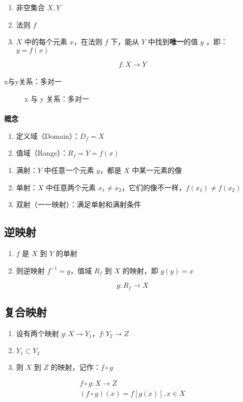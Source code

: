 \begin{enumerate}
  \item 非空集合 $X, Y$
  \item 法则 $f$
  \item $X$ 中的每个元素 $x$，在法则 $f$ 下，能从 $Y$ 中找到\textbf{唯一}的值 $y$ ，即： $y = f(x)$
\end{enumerate}

\begin{equation}
f:X \to Y
\end{equation}

\paragraph{}
x与y关系：多对一

\begin{figure}[H]
  \centering
    
    \caption{x 与 y 关系：多对一}
    \label{map}
\end{figure}

\paragraph{}
\textbf{概念}

\begin{enumerate}
  \item 定义域（Domain）：$D_f = X$
  \item 值域（Range）：$R_f = Y = f(x)$
\end{enumerate}

\begin{enumerate}
  \item 满射：$Y$ 中任意一个元素 $y$，都是 $X$ 中某一元素的像
  \item 单射：$X$ 中任意两个元素 $x_1 \neq  x_2$，它们的像不一样，$f(x_1) \neq  f(x_2)$
  \item 双射（一一映射）：满足单射和满射条件
\end{enumerate}

\subsection{逆映射}

\begin{enumerate}
  \item $f$ 是 $X$ 到 $Y$ 的单射
  \item 则逆映射 $f^{-1} = g$，值域 $R_f$ 到 $X$ 的映射，即 $g(y) = x$
\end{enumerate}

\begin{equation}
g:R_f \to X
\end{equation}

\subsection{复合映射}

\begin{enumerate}
  \item 设有两个映射 $g:X \to Y_1$，$f:Y_2 \to Z$
  \item $Y_1 \subset Y_2$
  \item 则 $X$ 到 $Z$ 的映射，记作：$f \circ g$
\end{enumerate}

\begin{gather}
f \circ g: X \to Z \\
(f \circ g)(x) = f[g(x)], x \in X
\end{gather}
